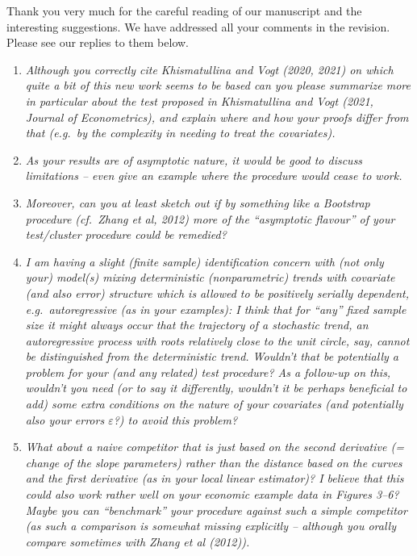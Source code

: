 \documentclass[a4paper,12pt]{article}
\begin{document}
Thank you very much for the careful reading of our manuscript and the interesting suggestions. We have addressed all your comments in the revision. Please see our replies to them below.
\begin{enumerate}[label=\arabic*.,leftmargin=0.6cm]

  
\item \textit{Although you correctly cite Khismatullina and Vogt (2020, 2021) on which quite a bit of this new work seems to be based can you please summarize more in particular about the test proposed in Khismatullina and Vogt (2021, Journal of Econometrics), and explain where and how your proofs differ from that (e.g.\ by the complexity in needing to treat the covariates).}


\item \textit{As your results are of asymptotic nature, it would be good to discuss limitations -- even give an example where the procedure would cease to work.}  


\item \textit{Moreover, can you at least sketch out if by something like a Bootstrap procedure (cf.\ Zhang et al, 2012) more of the ``asymptotic flavour'' of your test/cluster procedure could be remedied?}


\item \textit{I am having a slight (finite sample) identification concern with (not only your) model(s) mixing deterministic (nonparametric) trends with covariate (and also error) structure which is allowed to be positively serially dependent, e.g.\ autoregressive (as in your examples): I think that for ``any'' fixed sample size it might always occur that the trajectory of a stochastic trend, an autoregressive process with roots relatively close to the unit circle, say, cannot be distinguished from the deterministic trend. Wouldn't that be potentially a problem for your (and any related) test procedure? As a follow-up on this, wouldn't you need (or to say it differently, wouldn't it be perhaps beneficial to add) some extra conditions on the nature of your covariates (and potentially also your errors $\varepsilon$?) to avoid this problem?}  


\item \textit{What about a naive competitor that is just based on the second derivative (= change of the slope parameters) rather than the distance based on the curves and the first derivative (as in your local linear estimator)? I believe that this could also work rather well on your economic example data in Figures 3--6? Maybe you can ``benchmark'' your procedure against such a simple competitor (as such a comparison is somewhat missing explicitly -- although you orally compare sometimes with Zhang et al (2012)).}



\end{enumerate}
\end{document}
